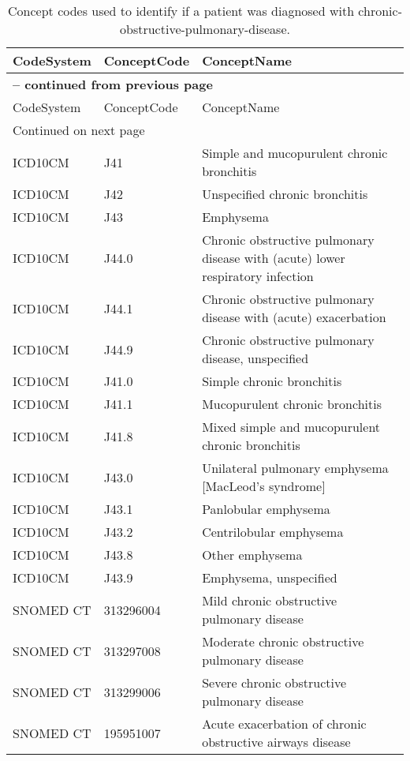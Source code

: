 \begin{longtable}{p{}p{}p{}}
\caption{Concept codes used to identify if a patient was diagnosed with chronic-obstructive-pulmonary-disease.} \\ 
 CodeSystem & ConceptCode & ConceptName \\ 
  \hline 
\endfirsthead 
\multicolumn{3}{p{\textwidth}}{{ \bfseries \tablename \thetable{} -- continued from previous page}} \\ 
\hline CodeSystem & ConceptCode & ConceptName \\ \hline 
\endhead 
\hline \multicolumn{3}{p{\textwidth}}{{Continued on next page}} \\ \hline 
\endfoot 
\hline 
\endlastfoot 
 \hline
ICD10CM & J41 & Simple and mucopurulent chronic bronchitis \\ 
  ICD10CM & J42 & Unspecified chronic bronchitis \\ 
  ICD10CM & J43 & Emphysema \\ 
  ICD10CM & J44.0 & Chronic obstructive pulmonary disease with (acute) lower respiratory infection \\ 
  ICD10CM & J44.1 & Chronic obstructive pulmonary disease with (acute) exacerbation \\ 
  ICD10CM & J44.9 & Chronic obstructive pulmonary disease, unspecified \\ 
  ICD10CM & J41.0 & Simple chronic bronchitis \\ 
  ICD10CM & J41.1 & Mucopurulent chronic bronchitis \\ 
  ICD10CM & J41.8 & Mixed simple and mucopurulent chronic bronchitis \\ 
  ICD10CM & J43.0 & Unilateral pulmonary emphysema [MacLeod's syndrome] \\ 
  ICD10CM & J43.1 & Panlobular emphysema \\ 
  ICD10CM & J43.2 & Centrilobular emphysema \\ 
  ICD10CM & J43.8 & Other emphysema \\ 
  ICD10CM & J43.9 & Emphysema, unspecified \\ 
  SNOMED CT & 313296004 & Mild chronic obstructive pulmonary disease \\ 
  SNOMED CT & 313297008 & Moderate chronic obstructive pulmonary disease \\ 
  SNOMED CT & 313299006 & Severe chronic obstructive pulmonary disease \\ 
  SNOMED CT & 195951007 & Acute exacerbation of chronic obstructive airways disease \\ 

\end{longtable}
